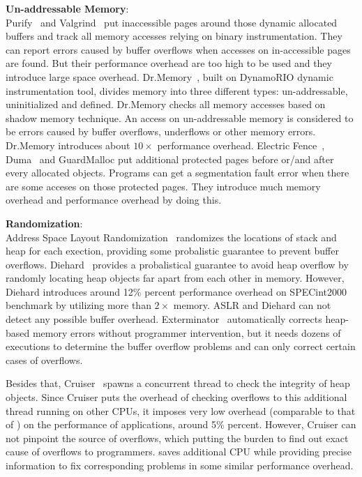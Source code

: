 \textbf{Un-addressable Memory}: \\
Purify~\cite{overflow:purify} and Valgrind~\cite{overflow:valgrind}
put inaccessible pages around those dynamic allocated buffers and 
track all memory accesses relying on binary instrumentation. 
They can report errors caused by buffer overflows when accesses on in-accessible pages are found.
But their performance overhead are too high to be used and they introduce large space overhead.
Dr.Memory~\cite{overflow:drmemory}, built on DynamoRIO dynamic instrumentation tool, divides memory
into three different types: un-addressable, uninitialized and defined. Dr.Memory checks all memory
accesses based on shadow memory technique. An access on un-addressable memory is considered
to be errors caused by buffer overflows, underflows or other memory errors. Dr.Memory introduces about $10\times$ performance overhead. 
Electric Fence~\cite{electricfence}, Duma~\cite{duma} and GuardMalloc put additional protected pages
before or/and after every allocated objects. Programs can get a segmentation fault error when there
are some acceses on those protected pages. They introduce much memory overhead and performance overhead
by doing this. 
 
\textbf{Randomization}: \\
Address Space Layout Randomization~\cite{addressobfuscation, Pax} randomizes the locations of stack and heap for each exection, providing some probalistic guarantee to prevent buffer overflows.  
Diehard~\cite{diehard} provides a probalistical guarantee to avoid heap overflow by randomly locating 
heap objects far apart from each other in memory. However, Diehard introduces around 12\% percent performance overhead on SPECint2000 benchmark by utilizing more than 
$2\times$ memory. 
ASLR and Diehard can not detect any possible buffer overhead. 
Exterminator~\cite{exterminator} automatically corrects heap-based memory errors without programmer 
intervention, but it needs dozens of executions to determine the buffer overflow 
problems and can only correct certain cases of overflows. 

Besides that, Cruiser~\cite{overflow:Cruiser} spawns a concurrent thread to check the integrity of heap objects.
Since Cruiser puts the overhead of checking overflows to this additional thread running on other CPUs,
it imposes very low overhead (comparable to that of \DoubleTake{}) on the performance of applications, 
around 5\% percent. However, Cruiser can not pinpoint the source of overflows, which putting the 
burden to find out exact cause of overflows to programmers. 
\DoubleTake{} saves additional CPU while providing precise information to fix corresponding problems
in some similar performance overhead.   

